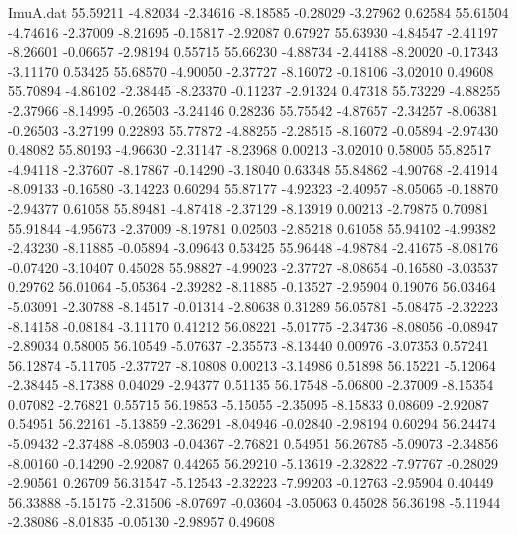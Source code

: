 \begin{filecontents}{ImuA.dat}
  55.59211   -4.82034   -2.34616   -8.18585   -0.28029   -3.27962    0.62584
  55.61504   -4.74616   -2.37009   -8.21695   -0.15817   -2.92087    0.67927
  55.63930   -4.84547   -2.41197   -8.26601   -0.06657   -2.98194    0.55715
  55.66230   -4.88734   -2.44188   -8.20020   -0.17343   -3.11170    0.53425
  55.68570   -4.90050   -2.37727   -8.16072   -0.18106   -3.02010    0.49608
  55.70894   -4.86102   -2.38445   -8.23370   -0.11237   -2.91324    0.47318
  55.73229   -4.88255   -2.37966   -8.14995   -0.26503   -3.24146    0.28236
  55.75542   -4.87657   -2.34257   -8.06381   -0.26503   -3.27199    0.22893
  55.77872   -4.88255   -2.28515   -8.16072   -0.05894   -2.97430    0.48082
  55.80193   -4.96630   -2.31147   -8.23968    0.00213   -3.02010    0.58005
  55.82517   -4.94118   -2.37607   -8.17867   -0.14290   -3.18040    0.63348
  55.84862   -4.90768   -2.41914   -8.09133   -0.16580   -3.14223    0.60294
  55.87177   -4.92323   -2.40957   -8.05065   -0.18870   -2.94377    0.61058
  55.89481   -4.87418   -2.37129   -8.13919    0.00213   -2.79875    0.70981
  55.91844   -4.95673   -2.37009   -8.19781    0.02503   -2.85218    0.61058
  55.94102   -4.99382   -2.43230   -8.11885   -0.05894   -3.09643    0.53425
  55.96448   -4.98784   -2.41675   -8.08176   -0.07420   -3.10407    0.45028
  55.98827   -4.99023   -2.37727   -8.08654   -0.16580   -3.03537    0.29762
  56.01064   -5.05364   -2.39282   -8.11885   -0.13527   -2.95904    0.19076
  56.03464   -5.03091   -2.30788   -8.14517   -0.01314   -2.80638    0.31289
  56.05781   -5.08475   -2.32223   -8.14158   -0.08184   -3.11170    0.41212
  56.08221   -5.01775   -2.34736   -8.08056   -0.08947   -2.89034    0.58005
  56.10549   -5.07637   -2.35573   -8.13440    0.00976   -3.07353    0.57241
  56.12874   -5.11705   -2.37727   -8.10808    0.00213   -3.14986    0.51898
  56.15221   -5.12064   -2.38445   -8.17388    0.04029   -2.94377    0.51135
  56.17548   -5.06800   -2.37009   -8.15354    0.07082   -2.76821    0.55715
  56.19853   -5.15055   -2.35095   -8.15833    0.08609   -2.92087    0.54951
  56.22161   -5.13859   -2.36291   -8.04946   -0.02840   -2.98194    0.60294
  56.24474   -5.09432   -2.37488   -8.05903   -0.04367   -2.76821    0.54951
  56.26785   -5.09073   -2.34856   -8.00160   -0.14290   -2.92087    0.44265
  56.29210   -5.13619   -2.32822   -7.97767   -0.28029   -2.90561    0.26709
  56.31547   -5.12543   -2.32223   -7.99203   -0.12763   -2.95904    0.40449
  56.33888   -5.15175   -2.31506   -8.07697   -0.03604   -3.05063    0.45028
  56.36198   -5.11944   -2.38086   -8.01835   -0.05130   -2.98957    0.49608

\end{filecontents}

